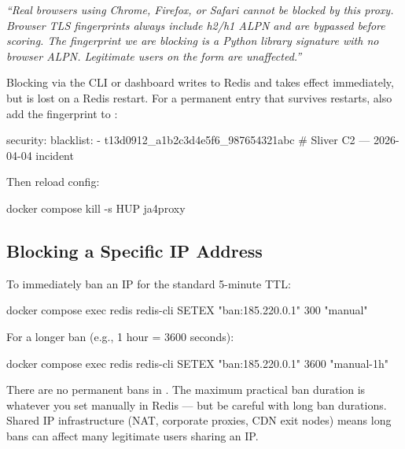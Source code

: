 \begin{tipbox}
\emph{``Real browsers using Chrome, Firefox, or Safari cannot be blocked by this
proxy. Browser TLS fingerprints always include h2/h1 ALPN and are bypassed before
scoring. The fingerprint we are blocking is a Python library signature with no
browser ALPN. Legitimate users on the form are unaffected.''}
\end{tipbox}

\begin{notebox}
Blocking via the CLI or dashboard writes to Redis and takes effect immediately,
but is lost on a Redis restart. For a permanent entry that survives restarts,
also add the fingerprint to :
\begin{yamlcode}
security:
  blacklist:
    - t13d0912_a1b2c3d4e5f6_987654321abc  # Sliver C2 — 2026-04-04 incident
\end{yamlcode}
Then reload config:
\begin{bashcode}
docker compose kill -s HUP ja4proxy
\end{bashcode}
\end{notebox}

\subsection{Blocking a Specific IP Address}

To immediately ban an IP for the standard 5-minute TTL:

\begin{bashcode}
docker compose exec redis redis-cli SETEX "ban:185.220.0.1" 300 "manual"
\end{bashcode}

For a longer ban (e.g., 1 hour = 3600 seconds):

\begin{bashcode}
docker compose exec redis redis-cli SETEX "ban:185.220.0.1" 3600 "manual-1h"
\end{bashcode}

\begin{notebox}
There are no permanent bans in \ja. The maximum practical ban duration is
whatever you set manually in Redis — but be careful with long ban durations.
Shared IP infrastructure (NAT, corporate proxies, CDN exit nodes) means long
bans can affect many legitimate users sharing an IP.
\end{notebox}

